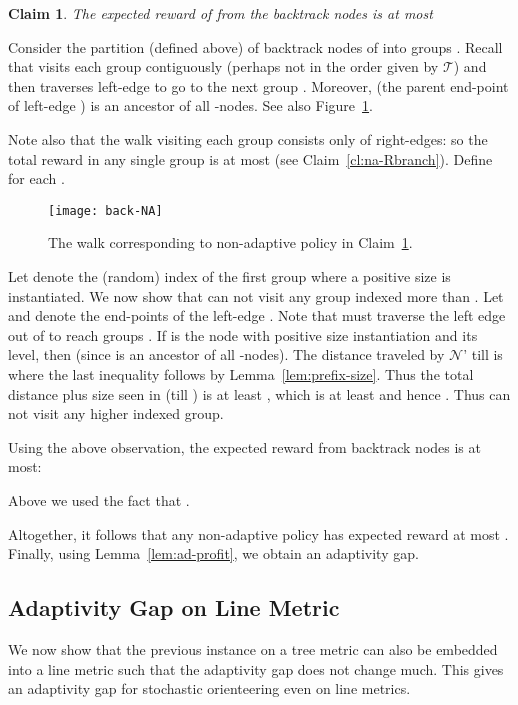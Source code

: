 \documentclass[11pt,letterpaper]{article}
\newtheorem{claim}[theorem]{Claim}
\numberwithin{algorithm}{section}
\newenvironment{proof}{

\noindent{\bf Proof:}}
{\hfill


}
\newcommand{\N}[0]{{\ensuremath{\mathcal{N}}}\xspace}
\newcommand{\T}{\ensuremath{\mathcal{T}}\xspace}
\begin{document}
\begin{claim}\label{cl:na-back}
The expected reward of  from the backtrack nodes is at most 
\end{claim}
\begin{proof}
Consider the partition (defined above) of backtrack nodes of  into groups . Recall that  visits each group  contiguously (perhaps not in the order given by \T) and then traverses left-edge  to go to the next group . Moreover,  (the parent end-point of left-edge ) is an ancestor of all -nodes. See also Figure~\ref{fig:back-NA}.

Note also that the walk visiting each group  consists only of right-edges: so the total reward in any single group  is at most  (see Claim~\ref{cl:na-Rbranch}). Define  for each .

\begin{figure}[ht]
  \begin{centering}
    \texttt{[image: back-NA]}
    \caption{The walk corresponding to non-adaptive policy  in Claim~\ref{cl:na-back}. \label{fig:back-NA} }
  \end{centering}
\end{figure}

Let  denote the (random) index of the first group where a positive size is  instantiated. We now show that  can not visit any group indexed more than . Let  and  denote the end-points of the left-edge . Note that  must traverse the left edge  out of  to reach groups . If  is the node with positive size instantiation and  its level, then  (since  is an ancestor of all -nodes). The distance traveled by \N' till  is 
 where the last inequality follows by Lemma~\ref{lem:prefix-size}. Thus the total distance plus size seen in  (till ) is at least  , which is at least  and hence . Thus  can not visit any higher indexed group.

Using the above observation, the expected reward from backtrack nodes is at most:

Above we used the fact that .
\end{proof}

Altogether, it follows that any non-adaptive policy  has expected reward at most . Finally, using Lemma~\ref{lem:ad-profit}, we obtain an  adaptivity gap.

\subsection{Adaptivity Gap on Line Metric}
We now show that the previous instance on a tree metric can also be embedded into a line metric such that the adaptivity gap does not change much. This gives an  adaptivity gap for stochastic orienteering even on line metrics.
\end{document}
